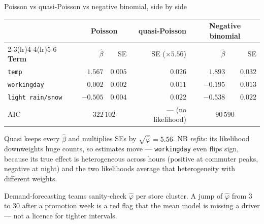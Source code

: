 \documentclass[aspectratio=169,11pt]{beamer}
\begin{document}
\begin{frame}{Poisson vs quasi-Poisson vs negative binomial, side by side}
  \footnotesize
  \begin{center}
  \begin{tabular}{@{}lrrrrr@{}}
    \toprule
    & \multicolumn{2}{c}{\textbf{Poisson}} & \textbf{quasi-Poisson} & \multicolumn{2}{c}{\textbf{Negative binomial}} \\
    \cmidrule(lr){2-3}\cmidrule(lr){4-4}\cmidrule(lr){5-6}
    \textbf{Term} & $\hat\beta$ & SE & SE ($\times 5.56$) & $\hat\beta$ & SE \\
    \midrule
    \texttt{temp} & $1.567$ & $0.005$ & $0.026$ & $1.893$ & $0.032$ \\
    \texttt{workingday} & $0.002$ & $0.002$ & $0.011$ & $-0.195$ & $0.013$ \\
    \texttt{light rain/snow} & $-0.505$ & $0.004$ & $0.022$ & $-0.538$ & $0.022$ \\
    \midrule
    AIC & \multicolumn{2}{c}{$322\,102$} & --- (no likelihood) & \multicolumn{2}{c}{$90\,590$} \\
    \bottomrule
  \end{tabular}
  \end{center}
  \begin{readme}
    Quasi keeps every $\hat\beta$ and multiplies SEs by $\sqrt{\hat\varphi}=5.56$. NB
    \emph{refits}: its likelihood downweights huge counts, so estimates move ---
    \texttt{workingday} even flips sign, because its true effect is heterogeneous
    across hours (positive at commuter peaks, negative at night) and the two
    likelihoods average that heterogeneity with different weights.
  \end{readme}
  \begin{industry}
    Demand-forecasting teams sanity-check $\hat\varphi$ per store cluster. A jump of
    $\hat\varphi$ from 3 to 30 after a promotion week is a red flag that the mean model
    is missing a driver --- not a licence for tighter intervals.
  \end{industry}
\end{frame}
\end{document}
